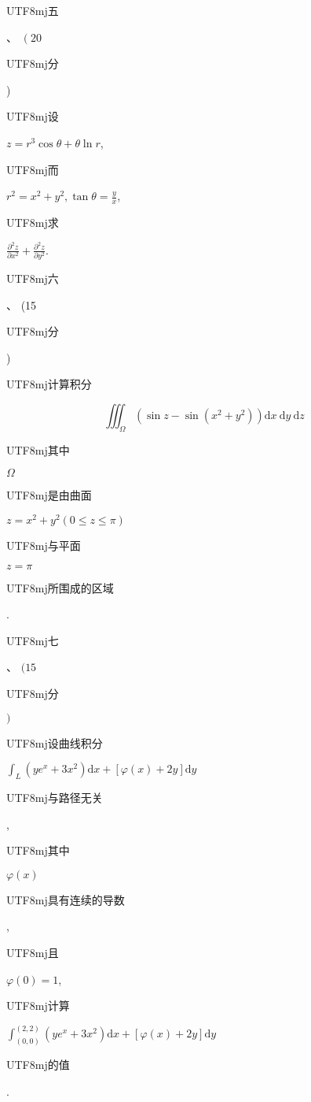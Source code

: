 \documentclass[10pt]{article}
\begin{document}
\begin{CJK}{UTF8}{mj}五\end{CJK}、 $\left(20\right.$ \begin{CJK}{UTF8}{mj}分\end{CJK}) \begin{CJK}{UTF8}{mj}设\end{CJK} $z=r^{3} \cos \theta+\theta \ln r$, \begin{CJK}{UTF8}{mj}而\end{CJK} $r^{2}=x^{2}+y^{2}, \tan \theta=\frac{y}{x}$, \begin{CJK}{UTF8}{mj}求\end{CJK} $\frac{\partial^{2} z}{\partial x^{2}}+\frac{\partial^{2} z}{\partial y^{2}}$.

\begin{CJK}{UTF8}{mj}六\end{CJK}、 (15 \begin{CJK}{UTF8}{mj}分\end{CJK}) \begin{CJK}{UTF8}{mj}计算积分\end{CJK}
$$
\iiint_{\Omega}\left(\sin z-\sin \left(x^{2}+y^{2}\right)\right) \mathrm{d} x \mathrm{~d} y \mathrm{~d} z
$$
\begin{CJK}{UTF8}{mj}其中\end{CJK} $\Omega$ \begin{CJK}{UTF8}{mj}是由曲面\end{CJK} $z=x^{2}+y^{2}(0 \leqslant z \leqslant \pi)$ \begin{CJK}{UTF8}{mj}与平面\end{CJK} $z=\pi$ \begin{CJK}{UTF8}{mj}所围成的区域\end{CJK}.

\begin{CJK}{UTF8}{mj}七\end{CJK}、 $(15$ \begin{CJK}{UTF8}{mj}分\end{CJK} $)$ \begin{CJK}{UTF8}{mj}设曲线积分\end{CJK} $\int_{L}\left(y e^{x}+3 x^{2}\right) \mathrm{d} x+[\varphi(x)+2 y] \mathrm{d} y$ \begin{CJK}{UTF8}{mj}与路径无关\end{CJK}, \begin{CJK}{UTF8}{mj}其中\end{CJK} $\varphi(x)$ \begin{CJK}{UTF8}{mj}具有连续的导数\end{CJK}, \begin{CJK}{UTF8}{mj}且\end{CJK} $\varphi(0)=1$, \begin{CJK}{UTF8}{mj}计算\end{CJK} $\int_{(0,0)}^{(2,2)}\left(y e^{x}+3 x^{2}\right) \mathrm{d} x+[\varphi(x)+2 y] \mathrm{d} y$ \begin{CJK}{UTF8}{mj}的值\end{CJK}.
\end{document}
